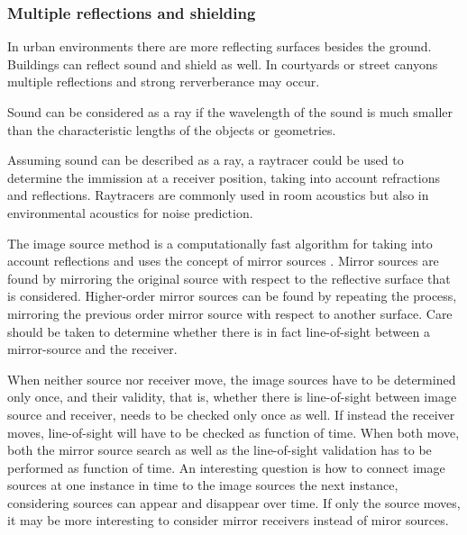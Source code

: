 




\subsubsection{Multiple reflections and shielding} %
In urban environments there are more reflecting surfaces besides the ground.
Buildings can reflect sound and shield as well. In courtyards or street canyons
multiple reflections and strong rerverberance may occur.

Sound can be considered as a ray if the wavelength of the sound is much smaller
than the characteristic lengths of the objects or geometries. %

Assuming sound can be described as a ray, a raytracer could be used to determine
the immission at a receiver position, taking into account refractions and
reflections. Raytracers are commonly used in room acoustics but also in
environmental acoustics for noise prediction.

The image source method is a computationally fast algorithm for taking into
account reflections and uses the concept of mirror sources
\cite{Allen1979,Mechel2013}. Mirror sources are found by mirroring the original
source with respect to the reflective surface that is considered. Higher-order
mirror sources can be found by repeating the process, mirroring the previous
order mirror source with respect to another surface. Care should be taken to
determine whether there is in fact line-of-sight between a mirror-source and the
receiver.

When neither source nor receiver move, the image sources have to be determined
only once, and their validity, that is, whether there is line-of-sight between
image source and receiver, needs to be checked only once as well. If instead the
receiver moves, line-of-sight will have to be checked as function of time. When
both move, both the mirror source search as well as the line-of-sight validation
has to be performed as function of time. An interesting question is how to
connect image sources at one instance in time to the image sources the next
instance, considering sources can appear and disappear over time. If only the
source moves, it may be more interesting to consider mirror receivers instead of
miror sources.

